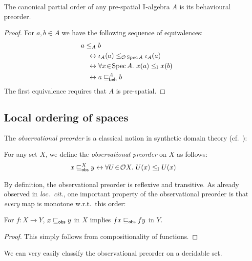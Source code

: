 \begin{proposition}\label{lem:canon-beh-coincide}
  The canonical partial order of any pre-spatial $\mathbb{I}$-algebra $A$ is its behavioural preorder.
\end{proposition}

\begin{proof}
  For $a,b\in A$ we have the following sequence of equivalences:
  \begin{align*}
    & a\le_A b \\
    &\quad\eq \iota_A(a) \le_{\opens\spec{A}} \iota_A(a)
    \\ 
    &\quad\eq \fa{x}{\spec{A}} x(a) \le_{\mbb{I}} x(b)
    \\ 
    &\quad\eq a\behle[A]b
  \end{align*}
  The first equivalence requires that $A$ is pre-spatial.
\end{proof}


\subsection{Local ordering of spaces}

The \emph{observational preorder} is a classical notion in synthetic domain theory (cf.\ \citet{PhoaWesleyKym-Son1991DtiR,hyland_first_2006}):

\begin{definition}\label{defn:specialisation}
  For any set $X$, we define the \emph{observational preorder} on $X$ as follows:
  \begin{align*}
    x\obsle[X] y 
    &\eq \fa{U}{\opens{X}} U(x)\le_\mbb{I} U(x)
  \end{align*}
\end{definition}

By definition, the observational preorder is reflexive and transitive. As already observed in \emph{loc.\ cit.}, one important property of the observational preorder is that \emph{every} map is monotone w.r.t.\ this order:

\begin{lemma}\label{lem:anymapmonotoneintriscorder}
  For $f \colon X \to Y$, $x \obsle y$ in $X$ implies $fx \obsle fy$ in $Y$.
\end{lemma}
\begin{proof}
  This simply follows from compositionality of functions.
\end{proof}

We can very easily classify the observational preorder on a decidable set.

